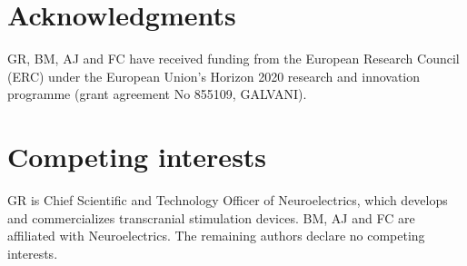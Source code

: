 \documentclass[11pt,a4paper]{article}
\newif\ifjne
\providecommand{\DIFdeltex}[1]{{\protect\color{red} \scriptsize #1}} %
\providecommand{\DIFdelbegin}{} %
\providecommand{\DIFdelend}{} %
\providecommand{\DIFdel}[1]{\texorpdfstring{\DIFdeltex{#1}}{}} %
\begin{document}
\section*{Acknowledgments}
GR, BM, AJ and FC have received funding from the European Research Council (ERC) under the
European Union's Horizon 2020 research and innovation programme (grant agreement No 855109,
GALVANI).

\ifjne
\section*{Competing interests}
GR is Chief Scientific and Technology Officer of Neuroelectrics, which develops and
commercializes transcranial stimulation devices. BM, AJ and FC are affiliated with
Neuroelectrics.
\DIFdelbegin \DIFdel{The remaining authors declare no competing interests.
}\DIFdelend %
\end{document}
